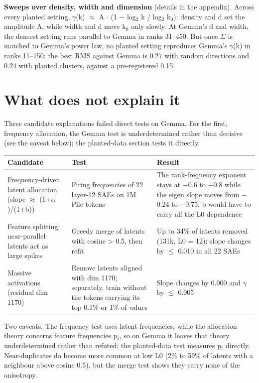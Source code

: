 \documentclass[11pt]{article}
\begin{document}
\textbf{Sweeps over density, width and dimension} (details in the appendix). Across every planted setting, $\gamma$(k) $\approx$ A $\cdot$ (1 $-$ log$_2$ k / log$_2$ k$_0$): density and d set the amplitude A, while width and d move k$_0$ only slowly. At Gemma's d and width, the densest setting runs parallel to Gemma in ranks 31--450. But once $\Sigma$ is matched to Gemma's power law, no planted setting reproduces Gemma's $\gamma$(k) in ranks 11--150: the best RMS against Gemma is 0.27 with random directions and 0.24 with planted clusters, against a pre-registered 0.15.

\section{What does not explain it}

Three candidate explanations failed direct tests on Gemma. For the first, frequency allocation, the Gemma test is underdetermined rather than decisive (see the caveat below); the planted-data section tests it directly.

{\small
\begin{xltabular}{\textwidth}{>{\raggedright\arraybackslash}X>{\raggedright\arraybackslash}X>{\raggedright\arraybackslash}X}
\toprule
\textbf{Candidate} & \textbf{Test} & \textbf{Result} \\
\midrule
\endhead
\bottomrule
\endlastfoot
Frequency-driven latent allocation (slope $\approx$ (1+$\alpha$)/(1+b)) & Firing frequencies of 22 layer-12 SAEs on 1M Pile tokens & The rank-frequency exponent stays at $-$0.6 to $-$0.8 while the eigen slope moves from $-$0.24 to $-$0.75; b would have to carry all the L0 dependence \\
Feature splitting: near-parallel latents act as large spikes & Greedy merge of latents with cosine > 0.5, then refit & Up to 34\% of latents removed (131k, L0 = 12); slope changes by $\le$ 0.010 in all 22 SAEs \\
Massive activations (residual dim 1170) & Remove latents aligned with dim 1170; separately, train without the tokens carrying its top 0.1\% or 1\% of values & Slope changes by 0.000 and $\gamma$ by $\le$ 0.005 \\
\end{xltabular}}

Two caveats. The frequency test uses latent frequencies, while the allocation theory concerns feature frequencies p$_i$, so on Gemma it leaves that theory underdetermined rather than refuted; the planted-data test measures p$_i$ directly. Near-duplicates do become more common at low L0 (2\% to 59\% of latents with a neighbour above cosine 0.5), but the merge test shows they carry none of the anisotropy.
\end{document}
